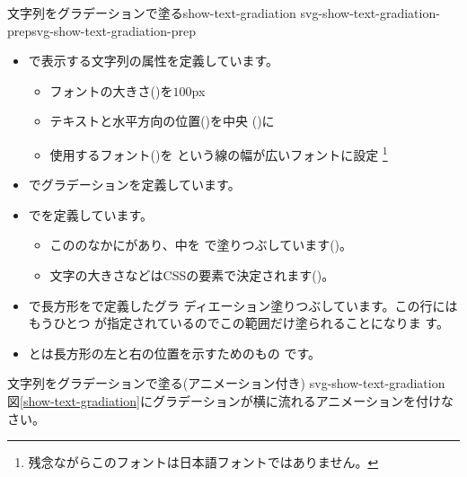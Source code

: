     {文字列をグラデーションで塗る}{show-text-gradiation}
{svg-show-text-gradiation-prep}{svg-show-text-gradiation-prep}
\begin{itemize}
 \item {}で表示する文字列の属性を定義しています。
\begin{itemize}
 \item フォントの大きさ()を$100$px
 \item テキストと水平方向の位置()を中央
       ()に
 \item 使用するフォント()を
       という線の幅が広いフォントに設定
\footnote{残念ながらこのフォントは日本語フォントではありません。}
\end{itemize}
 \item {}でグラデーションを定義しています。
 \item {}でを定義しています。
\begin{itemize}
 \item こののなかにがあり、中を
       で塗りつぶしています()。
 \item 文字の大きさなどはCSSの要素で決定されます()。
\end{itemize}
 \item {}で長方形をで定義したグラ
       ディエーション塗りつぶしています。この行にはもうひとつ
       が指定されているのでこの範囲だけ塗られることになりま
       す。
 \item {}とは長方形の左と右の位置を示すためのもの
       です。
\end{itemize}
{文字列をグラデーションで塗る(アニメーション付き)}
{svg-show-text-gradiation}
{図\ref{show-text-gradiation}にグラデーションが横に流れるアニメーションを付けなさい。}
\fi
